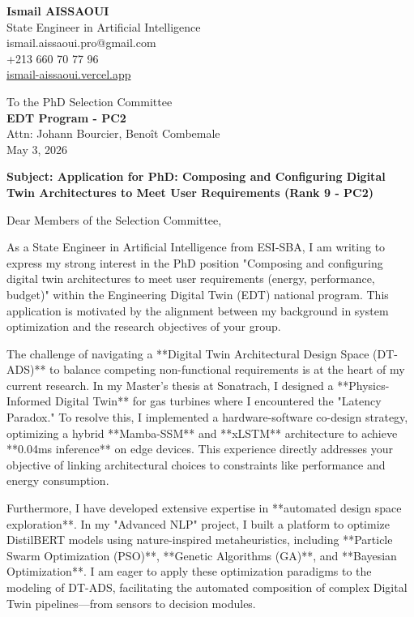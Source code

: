 \documentclass[a4paper,12pt]{article}
\begin{document}
\begin{flushleft}
    \textbf{Ismail AISSAOUI} \\
    State Engineer in Artificial Intelligence \\
    ismail.aissaoui.pro@gmail.com \\
    +213 660 70 77 96 \\
    \href{https://ismail-aissaoui.vercel.app}{ismail-aissaoui.vercel.app}
\end{flushleft}

\begin{flushright}
    To the PhD Selection Committee \\
    \textbf{EDT Program - PC2} \\
    Attn: Johann Bourcier, Benoît Combemale \\
    \medskip
    May 3, 2026
\end{flushright}

\bigskip

\noindent \textbf{Subject: Application for PhD: Composing and Configuring Digital Twin Architectures to Meet User Requirements (Rank 9 - PC2)}

\bigskip

Dear Members of the Selection Committee,

As a State Engineer in Artificial Intelligence from ESI-SBA, I am writing to express my strong interest in the PhD position "Composing and configuring digital twin architectures to meet user requirements (energy, performance, budget)" within the Engineering Digital Twin (EDT) national program. This application is motivated by the alignment between my background in system optimization and the research objectives of your group.

The challenge of navigating a **Digital Twin Architectural Design Space (DT-ADS)** to balance competing non-functional requirements is at the heart of my current research. In my Master's thesis at Sonatrach, I designed a **Physics-Informed Digital Twin** for gas turbines where I encountered the "Latency Paradox." To resolve this, I implemented a hardware-software co-design strategy, optimizing a hybrid **Mamba-SSM** and **xLSTM** architecture to achieve **0.04ms inference** on edge devices. This experience directly addresses your objective of linking architectural choices to constraints like performance and energy consumption.

Furthermore, I have developed extensive expertise in **automated design space exploration**. In my "Advanced NLP" project, I built a platform to optimize DistilBERT models using nature-inspired metaheuristics, including **Particle Swarm Optimization (PSO)**, **Genetic Algorithms (GA)**, and **Bayesian Optimization**. I am eager to apply these optimization paradigms to the modeling of DT-ADS, facilitating the automated composition of complex Digital Twin pipelines—from sensors to decision modules.
\end{document}
